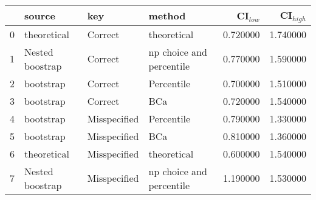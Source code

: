 \documentclass[a4paper,12pt]{article}
\theoremstyle{breaktheorem}
\theoremstyle{exerciseStyle}
\theoremstyle{solutionStyle}
\begin{document}
\begin{enumerate}
          \begin{tabular}{llllrr}
              \toprule
                & source          & key          & method                   & CI$_{low}$ & CI$_{high}$ \\
              \midrule
              0 & theoretical     & Correct      & theoretical              & 0.720000   & 1.740000    \\
              1 & Nested boostrap & Correct      & np choice and percentile & 0.770000   & 1.590000    \\
              2 & bootstrap       & Correct      & Percentile               & 0.700000   & 1.510000    \\
              3 & bootstrap       & Correct      & BCa                      & 0.720000   & 1.540000    \\
              4 & bootstrap       & Misspecified & Percentile               & 0.790000   & 1.330000    \\
              5 & bootstrap       & Misspecified & BCa                      & 0.810000   & 1.360000    \\
              6 & theoretical     & Misspecified & theoretical              & 0.600000   & 1.540000    \\
              7 & Nested boostrap & Misspecified & np choice and percentile & 1.190000   & 1.530000    \\
              \bottomrule
          \end{tabular}

\end{enumerate}
\end{document}

